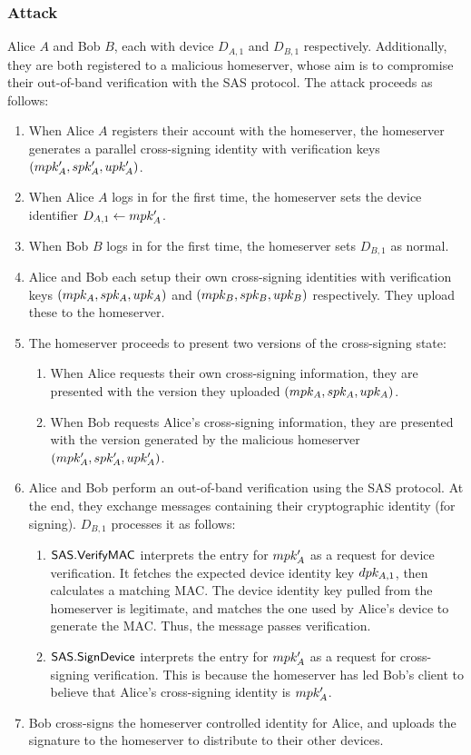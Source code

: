 \documentclass[aspectratio=169]{beamer}
\begin{document}
\begin{frame}[allowframebreaks]
  \frametitle{Attack}

  Alice $A$ and Bob $B$, each with device $D_{A,1}$ and $D_{B,1}$ respectively. Additionally, they are both registered to a malicious homeserver, whose aim is to compromise their out-of-band verification with the SAS protocol. The attack proceeds as follows:
  \begin{enumerate}
  \item When Alice $A$ registers their account with the homeserver, the homeserver generates a parallel cross-signing identity with verification keys $(\MasterPK[A]', \SelfPK[A]', \UserPK[A]')$.
  \item When Alice $A$ logs in for the first time, the homeserver sets the device identifier $D_{A,1} \assign \MasterPK[A]'$.
  \item When Bob $B$ logs in for the first time, the homeserver sets $D_{B,1}$ as normal.
  \item Alice and Bob each setup their own cross-signing identities with verification keys $(\MasterPK[A], \SelfPK[A], \UserPK[A])$ and $(\MasterPK[B], \SelfPK[B], \UserPK[B])$ respectively. They upload these to the homeserver.
   \framebreak
  \item The homeserver proceeds to present two versions of the cross-signing state:
    \begin{enumerate}
    \item When Alice requests their own cross-signing information, they are presented with the version they uploaded $(\MasterPK[A], \SelfPK[A], \UserPK[A])$.
    \item When Bob requests Alice's cross-signing information, they are presented with the version generated by the malicious homeserver $(\MasterPK[A]', \SelfPK[A]', \UserPK[A]')$.
    \end{enumerate}
  \framebreak
  \item Alice and Bob perform an out-of-band verification using the SAS protocol. At the end, they exchange \MsgTypeVerificationMAC{} messages containing their cryptographic identity (for signing).
    \(D_{B,1}\) processes it as follows:
    \begin{enumerate}
    \item $\mathsf{SAS}.\mathsf{VerifyMAC}$ interprets the entry for $\MasterPK[A]'$ as a request for device verification. It fetches the expected device identity key $\DevicePK[A,1]$, then calculates a matching MAC. The device identity key pulled from the homeserver is legitimate, and matches the one used by Alice's device to generate the MAC\@. Thus, the message passes verification.
    \item $\mathsf{SAS}.\mathsf{SignDevice}$ interprets the entry for $\MasterPK[A]'$ as a request for cross-signing verification. This is because the homeserver has led Bob's client to believe that Alice's cross-signing identity is $\MasterPK[A]'$.
    \end{enumerate}
  \item Bob cross-signs the homeserver controlled identity for Alice, and uploads the signature to the homeserver to distribute to their other devices.
  \end{enumerate}


\end{frame}
\end{document}
